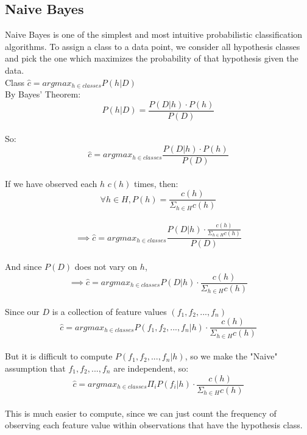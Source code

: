 \documentclass{amsart}
\theoremstyle{definition}
\theoremstyle{remark}
\numberwithin{equation}{section}
\begin{document}
\subsection{Naive Bayes}
Naive Bayes is one of the simplest and most intuitive probabilistic classification algorithms. To assign a class to a data point, we consider all hypothesis classes and pick the one which maximizes the probability of that hypothesis given the data.\\
Class $\hat{c} = argmax_{h \in classes} P(h \vert D)$\\
By Bayes' Theorem:\\
$$P(h \vert D) = \frac{P(D \vert h) \cdot P(h)}{P(D)}$$\\
So:\\
$$\hat{c} = argmax_{h \in classes} \frac{P(D \vert h) \cdot P(h)}{P(D)}$$\\
If we have observed each $h$ $c(h)$ times, then:\\
$$\forall h \in H, P(h) = \frac{c(h)}{\Sigma_{h \in H} c(h)}$$\\
$$\implies \hat{c} = argmax_{h \in classes} \frac{P(D \vert h) \cdot \frac{c(h)}{\Sigma_{h \in H} c(h)}}{P(D)}$$\\
And since $P(D)$ does not vary on $h$,\\
$$\implies \hat{c} = argmax_{h \in classes} P(D \vert h) \cdot \frac{c(h)}{\Sigma_{h \in H} c(h)}$$\\
Since our $D$ is a collection of feature values $(f_1, f_2, ..., f_n)$\\
$$\hat{c} = argmax_{h \in classes} P(f_1, f_2, ..., f_n \vert h) \cdot \frac{c(h)}{\Sigma_{h \in H} c(h)}$$\\
But it is difficult to compute $P(f_1, f_2, ..., f_n \vert h)$, so we make the "Naive" assumption that $f_1, f_2, ..., f_n$ are independent, so:\\
$$\hat{c} = argmax_{h \in classes} \Pi_i P(f_i \vert h) \cdot \frac{c(h)}{\Sigma_{h \in H} c(h)}$$\\
This is much easier to compute, since we can just count the frequency of observing each feature value within observations that have the hypothesis class.\\
\end{document}
